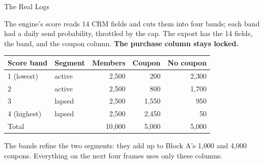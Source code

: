 \documentclass[aspectratio=169, 11pt, handout]{beamer}
\begin{document}
\begin{frame}{The Real Logs}

The engine's score reads 14 CRM fields and cuts them into four bands; each band had a daily send probability, throttled by the cap. The export has the 14 fields, the band, and the coupon column. \textbf{The purchase column stays locked.}

\begin{center}
\begin{tabular}{llrrr}
\toprule
\textbf{Score band} & \textbf{Segment} & \textbf{Members} & \textbf{Coupon} & \textbf{No coupon} \\
\midrule
1 (lowest) & active & 2{,}500 & 200 & 2{,}300 \\
2 & active & 2{,}500 & 800 & 1{,}700 \\
3 & lapsed & 2{,}500 & 1{,}550 & 950 \\
4 (highest) & lapsed & 2{,}500 & 2{,}450 & 50 \\
\midrule
Total & & 10{,}000 & 5{,}000 & 5{,}000 \\
\bottomrule
\end{tabular}
\end{center}

\medskip

The bands refine the two segments: they add up to Block A's 1{,}000 and 4{,}000 coupons. Everything on the next four frames uses only these columns.
\end{frame}
\end{document}
